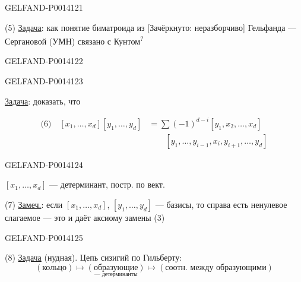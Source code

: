 \begin{GelfandAdjacentEvidence}{GELFAND-P001412}{1}

(5) \uline{Задача}: как понятие биматроида из
[Зачёркнуто: неразборчиво] Гельфанда — Сергановой (УМН)
связано с Кунтом\textsuperscript{?}
\end{GelfandAdjacentEvidence}
\begin{GelfandAdjacentEvidence}{GELFAND-P001412}{2}

\end{GelfandAdjacentEvidence}
\begin{GelfandAdjacentEvidence}{GELFAND-P001412}{3}


\uline{Задача}: доказать, что

\[
\begin{aligned}
\text{(6)}\quad [x_1,\ldots,x_d][y_1,\ldots,y_d]
 &= \sum(-1)^{d-i}[y_1,x_2,\ldots,x_d]\\
 &\qquad [y_1,\ldots,y_{i-1},x_i,y_{i+1},\ldots,y_d]
\end{aligned}
\]
\end{GelfandAdjacentEvidence}
\begin{GelfandAdjacentEvidence}{GELFAND-P001412}{4}


\([x_1,\ldots,x_d]\) — детерминант, постр. по вект.

(7) \uline{Замеч.}: если \([x_1,\ldots,x_d]\), \([y_1,\ldots,y_d]\)
— базисы, то справа есть ненулевое слагаемое — это и даёт аксиому замены (3)
\end{GelfandAdjacentEvidence}
\begin{GelfandAdjacentEvidence}{GELFAND-P001412}{5}


(8) \uline{Задача} (нудная). Цепь сизигий по Гильберту:
\[
(\text{кольцо})\longmapsto
\underset{\text{— детерминанты}}{(\text{образующие})}
\longmapsto (\text{соотн. между образующими})
\]
\end{GelfandAdjacentEvidence}
